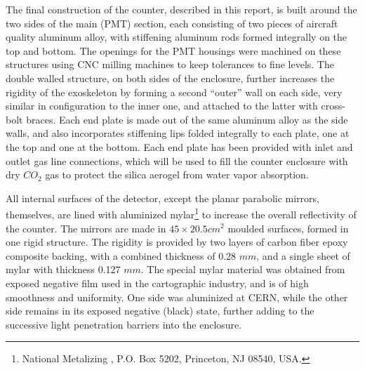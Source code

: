 {The final construction of the counter, described in this report, is built
around the two sides of the main (PMT) section, each consisting of two pieces
of aircraft quality aluminum alloy, with stiffening aluminum rods formed
integrally on the top and bottom.  
The openings for the PMT housings were machined on these structures using CNC 
milling machines to keep tolerances to fine levels.  
The double walled structure, on both sides of the enclosure, further increases 
the rigidity of the exoskeleton by forming a second ``outer'' wall on each side, 
very similar in configuration to the inner one, and attached to the latter with 
cross-bolt braces.
Each end plate is made out of the same aluminum alloy as the side walls, and
also incorporates stiffening lips folded integrally to each plate, one at the
top and one at the bottom.  Each end plate has been provided with inlet and
outlet gas line connections, which will be used to fill the counter enclosure
with dry $CO_2$ gas to protect the silica aerogel from water vapor absorption.

All internal surfaces of the detector, except the planar parabolic mirrors,
themselves, are lined with aluminized 
mylar\footnote{National Metalizing , P.O. Box 5202, Princeton, NJ 08540, USA.} 
to increase the overall reflectivity of the counter.  
The mirrors are made in $45\times 20.5 cm^2$ moulded surfaces, formed in one 
rigid structure. 
The rigidity is provided by two layers of carbon fiber epoxy composite backing, 
with a combined thickness of 0.28 $mm$, and a single sheet of mylar with 
thickness 0.127 $mm$. 
The special mylar material was obtained from exposed negative film used in the
cartographic industry, and is of high smoothness and uniformity. One side was
aluminized at CERN, while the other side remains in its exposed negative
(black) state, further adding to the successive light penetration barriers into
the enclosure.  
 
}
